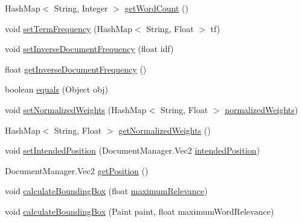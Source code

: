 \begin{DoxyCompactItemize}
\item 
Hash\+Map$<$ String, Integer $>$ \mbox{\hyperlink{classio_1_1github_1_1syzygy2048_1_1radcloud_1_1_word_ad8eee7d4d1d7b307312855b069dbe5cd}{get\+Word\+Count}} ()
\item 
void \mbox{\hyperlink{classio_1_1github_1_1syzygy2048_1_1radcloud_1_1_word_af55e8190330dd775ea153fee1750176a}{set\+Term\+Frequency}} (Hash\+Map$<$ String, Float $>$ tf)
\item 
void \mbox{\hyperlink{classio_1_1github_1_1syzygy2048_1_1radcloud_1_1_word_a234e5e329ae68e4026a09ddeed7945bf}{set\+Inverse\+Document\+Frequency}} (float idf)
\item 
float \mbox{\hyperlink{classio_1_1github_1_1syzygy2048_1_1radcloud_1_1_word_a1b4a8a0ca776c16a5f2192f59f2974b3}{get\+Inverse\+Document\+Frequency}} ()
\item 
boolean \mbox{\hyperlink{classio_1_1github_1_1syzygy2048_1_1radcloud_1_1_word_ad35bce76832c85b100a4346da0f20a00}{equals}} (Object obj)
\item 
void \mbox{\hyperlink{classio_1_1github_1_1syzygy2048_1_1radcloud_1_1_word_a493351b57cf532161237dd873509f79d}{set\+Normalized\+Weights}} (Hash\+Map$<$ String, Float $>$ \mbox{\hyperlink{classio_1_1github_1_1syzygy2048_1_1radcloud_1_1_word_a73284999ac4b313793306806096f6a86}{normalized\+Weights}})
\item 
Hash\+Map$<$ String, Float $>$ \mbox{\hyperlink{classio_1_1github_1_1syzygy2048_1_1radcloud_1_1_word_aee98861b9717bf6e3a013b0d4d5bf3c4}{get\+Normalized\+Weights}} ()
\item 
void \mbox{\hyperlink{classio_1_1github_1_1syzygy2048_1_1radcloud_1_1_word_a0032169550f9764ce15473b5043e6d59}{set\+Intended\+Position}} (Document\+Manager.\+Vec2 \mbox{\hyperlink{classio_1_1github_1_1syzygy2048_1_1radcloud_1_1_word_a064f2f7f9b0e939fe3b2cfd2cc87817f}{intended\+Position}})
\item 
Document\+Manager.\+Vec2 \mbox{\hyperlink{classio_1_1github_1_1syzygy2048_1_1radcloud_1_1_word_a5e03f2a9bb4acf21a8e991b060126994}{get\+Position}} ()
\item 
void \mbox{\hyperlink{classio_1_1github_1_1syzygy2048_1_1radcloud_1_1_word_a47529581dc9d3302b054c7a33981c375}{calculate\+Bounding\+Box}} (float \mbox{\hyperlink{classio_1_1github_1_1syzygy2048_1_1radcloud_1_1_word_aed758b7df9156075124f25815df3f045}{maximum\+Relevance}})
\item 
void \mbox{\hyperlink{classio_1_1github_1_1syzygy2048_1_1radcloud_1_1_word_a3bd7b70cf654bbe3c0f6db2bfbaf0929}{calculate\+Bounding\+Box}} (Paint paint, float maximum\+Word\+Relevance)
\end{DoxyCompactItemize}
